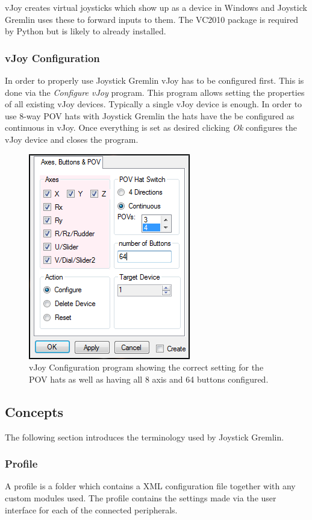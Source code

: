 \documentclass[a4, 10pt]{article}
\newcommand{\JG}{Joystick Gremlin}
\begin{document}
vJoy creates virtual joysticks which show up as a device in Windows and
\JG{} uses these to forward inputs to them. The VC2010 package is
required by Python but is likely to already installed.

\subsubsection{vJoy Configuration}

In order to properly use \JG{} vJoy has to be configured first. This is
done via the \emph{Configure vJoy} program. This program allows setting
the properties of all existing vJoy devices. Typically a single vJoy
device is enough. In order to use 8-way POV hats with \JG{} the hats
have the be configured as continuous in vJoy. Once everything is set as
desired clicking \emph{Ok} configures the vJoy device and closes the
program.

\begin{figure}[bt]
    \centering

    \includegraphics[width=0.5\linewidth]{images/vjoy_configuration}
    \caption{vJoy Configuration program showing the correct setting for
        the POV hats as well as having all 8 axis and 64 buttons
        configured.}
\end{figure}


\subsection{Concepts}
\label{sec:concepts}

The following section introduces the terminology used by \JG{}.


\subsubsection{Profile}
A profile is a folder which contains a XML configuration file together
with any custom modules used. The profile contains the settings made via
the user interface for each of the connected peripherals.
\end{document}
